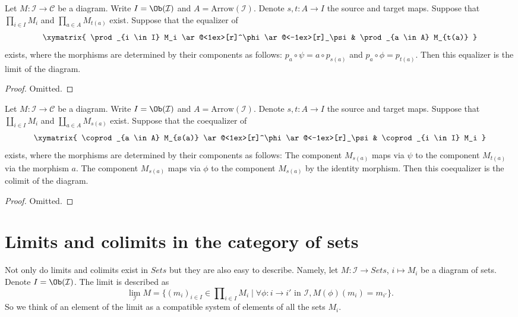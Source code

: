 \begin{lemma}
\label{lemma-limits-products-equalizers}
Let $M : \mathcal{I} \to \mathcal{C}$ be a diagram.
Write $I = \Ob(\mathcal{I})$ and $A = \text{Arrow}(\mathcal{I})$.
Denote $s, t : A \to I$ the source and target maps.
Suppose that $\prod_{i \in I} M_i$ and $\prod_{a \in A} M_{t(a)}$
exist. Suppose that the equalizer of
$$
\xymatrix{
\prod_{i \in I} M_i
\ar@<1ex>[r]^\phi \ar@<-1ex>[r]_\psi
&
\prod_{a \in A} M_{t(a)}
}
$$
exists, where the morphisms are determined by their components
as follows: $p_a \circ \psi = a \circ p_{s(a)}$
and $p_a \circ \phi = p_{t(a)}$. Then this equalizer is the
limit of the diagram.
\end{lemma}

\begin{proof}
Omitted.
\end{proof}


\begin{lemma}
\label{lemma-colimits-coproducts-coequalizers}
Let $M : \mathcal{I} \to \mathcal{C}$ be a diagram.
Write $I = \Ob(\mathcal{I})$ and $A = \text{Arrow}(\mathcal{I})$.
Denote $s, t : A \to I$ the source and target maps.
Suppose that $\coprod_{i \in I} M_i$ and $\coprod_{a \in A} M_{s(a)}$
exist. Suppose that the coequalizer of
$$
\xymatrix{
\coprod_{a \in A} M_{s(a)}
\ar@<1ex>[r]^\phi \ar@<-1ex>[r]_\psi
&
\coprod_{i \in I} M_i
}
$$
exists, where the morphisms are determined by their components
as follows: The component $M_{s(a)}$ maps via $\psi$
to the component $M_{t(a)}$ via the morphism $a$.
The component $M_{s(a)}$ maps via $\phi$ to the component
$M_{s(a)}$ by the identity morphism. Then this coequalizer is the
colimit of the diagram.
\end{lemma}

\begin{proof}
Omitted.
\end{proof}







\section{Limits and colimits in the category of sets}
\label{section-limit-sets}

\noindent
Not only do limits and colimits exist in $\textit{Sets}$
but they are also easy to describe. Namely, let $M : \mathcal{I}
\to \textit{Sets}$, $i \mapsto M_i$ be a diagram of sets.
Denote $I = \Ob(\mathcal{I})$.
The limit is described as
$$
\lim_\mathcal{I} M
=
\{
(m_i)_{i\in I} \in \prod\nolimits_{i\in I} M_i
\mid
\forall \phi : i \to i' \text{ in }\mathcal{I},
M(\phi)(m_i) = m_{i'}
\}.
$$
So we think of an element of the limit as a compatible system of elements
of all the sets $M_i$.

